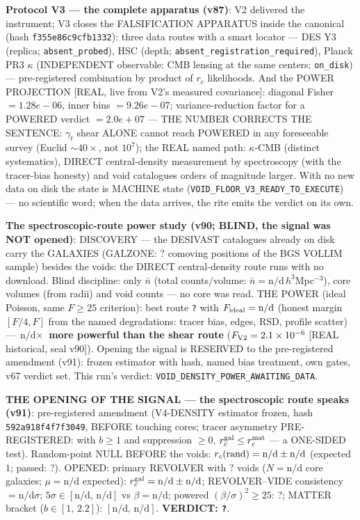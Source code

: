 \documentclass[11pt]{article}
\theoremstyle{definition}\newtheorem{deriv}{Derivation}
\begin{document}
\textbf{Protocol V3 --- the complete apparatus (v87)}: V2 delivered the instrument; V3 closes the FALSIFICATION APPARATUS inside the canonical (hash \texttt{f355e86c9cfb1332}): three data routes with a smart locator --- DES Y3 (replica; \texttt{absent\_probed}), HSC (depth; \texttt{absent\_registration\_required}), Planck PR3 $\kappa$ (INDEPENDENT observable: CMB lensing at the same centers; \texttt{on\_disk}) --- pre-registered combination by product of $r_c$ likelihoods. And the POWER PROJECTION [REAL, live from V2's measured covariance]: diagonal Fisher $=1.28e-06$, inner bins $=9.26e-07$; variance-reduction factor for a POWERED verdict $=2.0e+07$ --- THE NUMBER CORRECTS THE SENTENCE: $\gamma_t$ shear ALONE cannot reach POWERED in any foreseeable survey (Euclid $\sim40\times$, not $10^7$); the REAL named path: $\kappa$-CMB (distinct systematics), DIRECT central-density measurement by spectroscopy (with the tracer-bias honesty) and void catalogues orders of magnitude larger. With no new data on disk the state is MACHINE state (\texttt{VOID\_FLOOR\_V3\_READY\_TO\_EXECUTE}) --- no scientific word; when the data arrives, the rite emits the verdict on its own.

\textbf{The spectroscopic-route power study (v90; BLIND, the signal was NOT opened)}: DISCOVERY --- the DESIVAST catalogues already on disk carry the GALAXIES (GALZONE: $?$ comoving positions of the BGS VOLLIM sample) besides the voids: the DIRECT central-density route runs with no download. Blind discipline: only $\bar n$ (total counts$/$volume: $\bar n=\text{n/d}\,h^3$Mpc$^{-3}$), core volumes (from radii) and void counts --- no core was read. THE POWER (ideal Poisson, same $F\ge25$ criterion): best route \texttt{?} with $F_{\rm ideal}=\text{n/d}$ (honest margin $[F/4,F]$ from the named degradations: tracer bias, edges, RSD, profile scatter) --- \textbf{$\text{n/d}\times$ more powerful than the shear route} ($F_{\rm V2}=2.1\times10^{-6}$ [REAL historical, seal v90]). Opening the signal is RESERVED to the pre-registered amendment (v91): frozen estimator with hash, named bias treatment, own gates, v67 verdict set. This run's verdict: \texttt{VOID\_DENSITY\_POWER\_AWAITING\_DATA}.

\textbf{THE OPENING OF THE SIGNAL --- the spectroscopic route speaks (v91)}: pre-registered amendment (V4-DENSITY estimator frozen, hash \texttt{592a918f4f7f3049}, BEFORE touching cores; tracer asymmetry PRE-REGISTERED: with $b\ge1$ and suppression $\ge0$, $r_c^{\rm gal}\le r_c^{\rm mat}$ --- a ONE-SIDED test). Random-point NULL BEFORE the voids: $r_c({\rm rand})=\text{n/d}\pm\text{n/d}$ (expected $1$; passed: ?). OPENED: primary REVOLVER with $?$ voids ($N=\text{n/d}$ core galaxies; $\mu=\text{n/d}$ expected): $r_c^{\rm gal}=\text{n/d}\pm\text{n/d}$; REVOLVER--VIDE consistency $=\text{n/d}\sigma$; $5\sigma\in[\text{n/d},\,\text{n/d}]$ vs $\beta=\text{n/d}$; powered $(\beta/\sigma)^2\ge25$: ?; MATTER bracket ($b\in[1,\,2.2]$): $[\text{n/d},\,\text{n/d}]$. \textbf{VERDICT: \texttt{?}}.
\end{document}
